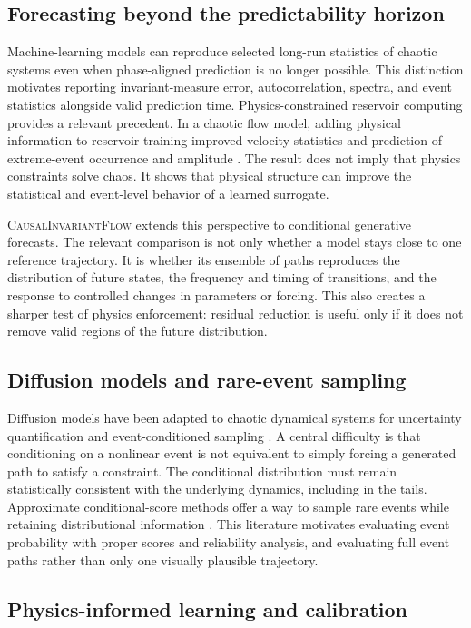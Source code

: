 \documentclass[11pt]{article}
\newcommand{\method}{\textsc{CausalInvariantFlow}}
\begin{document}
\subsection{Forecasting beyond the predictability horizon}

Machine-learning models can reproduce selected long-run statistics of chaotic systems even when phase-aligned prediction is no longer possible. This distinction motivates reporting invariant-measure error, autocorrelation, spectra, and event statistics alongside valid prediction time. Physics-constrained reservoir computing provides a relevant precedent. In a chaotic flow model, adding physical information to reservoir training improved velocity statistics and prediction of extreme-event occurrence and amplitude \cite{brunton2021physics}. The result does not imply that physics constraints solve chaos. It shows that physical structure can improve the statistical and event-level behavior of a learned surrogate.

\method{} extends this perspective to conditional generative forecasts. The relevant comparison is not only whether a model stays close to one reference trajectory. It is whether its ensemble of paths reproduces the distribution of future states, the frequency and timing of transitions, and the response to controlled changes in parameters or forcing. This also creates a sharper test of physics enforcement: residual reduction is useful only if it does not remove valid regions of the future distribution.

\subsection{Diffusion models and rare-event sampling}

Diffusion models have been adapted to chaotic dynamical systems for uncertainty quantification and event-conditioned sampling \cite{mora2023events}. A central difficulty is that conditioning on a nonlinear event is not equivalent to simply forcing a generated path to satisfy a constraint. The conditional distribution must remain statistically consistent with the underlying dynamics, including in the tails. Approximate conditional-score methods offer a way to sample rare events while retaining distributional information \cite{mora2023events}. This literature motivates evaluating event probability with proper scores and reliability analysis, and evaluating full event paths rather than only one visually plausible trajectory.

\subsection{Physics-informed learning and calibration}
\end{document}
